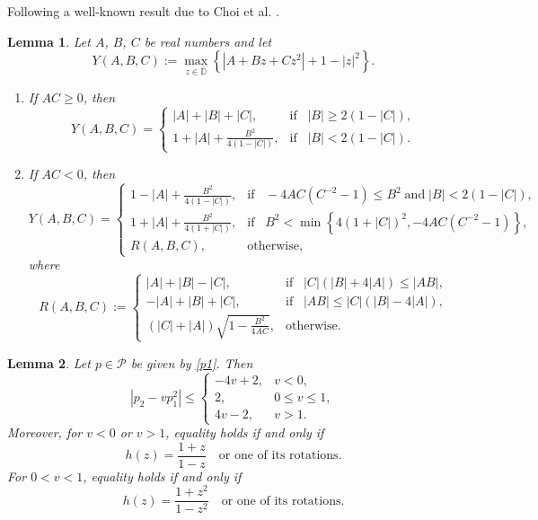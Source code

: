 \documentclass[11pt,reqno]{amsart}
\newtheorem{lem}{Lemma}[section]
\newcommand{\ol}{\overline}
\numberwithin{equation}{section}
\begin{document}
Following a well-known result due to Choi et al. \cite{CKS1}.
\begin{lem}\label{L2}\cite{CKS1} Let $A$, $B$, $C$ be real numbers and let
\[Y(A, B, C):= \max\limits_{z\in \ol{\mathbb{D}}}\left\lbrace |A+Bz+Cz^2|+1-|z|^2\right\rbrace.\]
\begin{enumerate} 
\item[(i)] If $AC\ge 0$, then
\[Y(A, B, C) =
\begin{cases}
|A|+|B|+|C|, & \text{if}\;\;\; |B|\ge 2(1-|C|), \\
1+|A|+\frac{B^2}{4(1-|C|)}, &\text{if}\;\;\; |B|<2(1-|C|).
\end{cases}
\]
\item[(ii)] If $AC<0$, then 
\[Y(A,B,C)=
\begin{cases}
1-|A|+\frac{B^2}{4(1-|C|)}, &\text{if}\;\;\; -4AC(C^{-2}-1) \le B^2\; \text{and}\; |B|<2(1-|C|), \\
1+|A|+\frac{B^2}{4(1+|C|)}, &\text{if}\;\;\; B^2<\min\left\{4(1+|C|)^2, -4AC(C^{-2}-1) \right\}, \\
R(A,B,C), &\text{otherwise},
\end{cases}
\]
where
\[R(A,B,C):=
\begin{cases}
|A|+|B|-|C|, & \text{if}\;\;\; |C|(|B|+4|A|) \le |AB|, \\
-|A|+|B|+|C|, & \text{if}\;\;\; |AB|\le |C|(|B|-4|A|), \\
(|C|+|A| )\sqrt{1-\frac{B^2}{4AC}}, &\text{otherwise}.
\end{cases}
\]
\end{enumerate} 
\end{lem}

\begin{lem}\label{L3} \cite{MM}
Let $p \in \mathcal{P}$ be given by \eqref{p1}. Then
\[
\left| p_2 - v p_1^2 \right| \le 
\begin{cases}
-4v + 2, & v < 0, \\
2, & 0 \le v \le 1, \\
4v - 2, & v > 1.
\end{cases}
\]
Moreover, for $v < 0$ or $v > 1$, equality holds if and only if
\[
h(z) = \frac{1+z}{1-z} \quad \text{or one of its rotations}.
\]
For $0 < v < 1$, equality holds if and only if
\[
h(z) = \frac{1+z^2}{1-z^2} \quad \text{or one of its rotations}.
\]
\end{lem}
\end{document}
